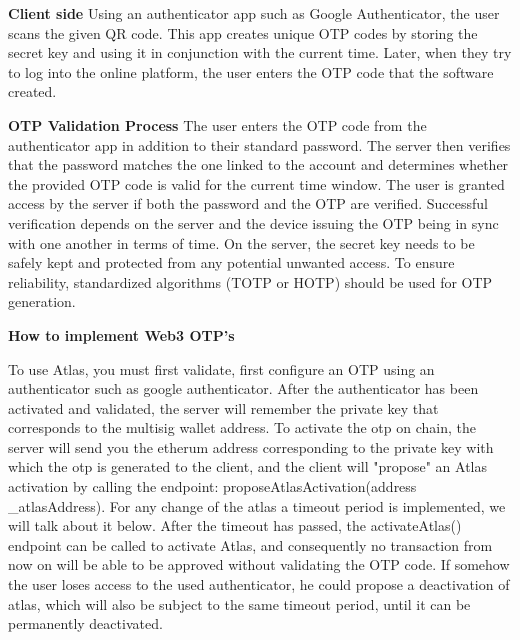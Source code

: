 \par \textbf{Client side} 
Using an authenticator app such as Google Authenticator, the user scans the given QR code. This app creates unique OTP codes by storing the secret key and using it in conjunction with the current time. Later, when they try to log into the online platform, the user enters the OTP code that the software created.
\par \textbf{OTP Validation Process} 
The user enters the OTP code from the authenticator app in addition to their standard password. The server then verifies that the password matches the one linked to the account and determines whether the provided OTP code is valid for the current time window. The user is granted access by the server if both the password and the OTP are verified. Successful verification depends on the server and the device issuing the OTP being in sync with one another in terms of time.  On the server, the secret key needs to be safely kept and protected from any potential unwanted access. To ensure reliability, standardized algorithms (TOTP or HOTP) should be used for OTP generation.
\par \textbf{How to implement Web3 OTP's} 
\par To use Atlas, you must first validate, first configure an OTP using an authenticator such as google authenticator. After the authenticator has been activated and validated, the server will remember the private key that corresponds to the multisig wallet address. To activate the otp on chain, the server will send you the etherum address corresponding to the private key with which the otp is generated to the client, and the client will "propose" an Atlas activation by calling the endpoint: proposeAtlasActivation(address \_atlasAddress). For any change of the atlas a timeout period is implemented, we will talk about it below. After the timeout has passed, the activateAtlas() endpoint can be called to activate Atlas, and consequently no transaction from now on will be able to be approved without validating the OTP code. If somehow the user loses access to the used authenticator, he could propose a deactivation of atlas, which will also be subject to the same timeout period, until it can be permanently deactivated.

